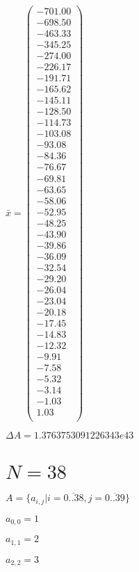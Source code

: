 \documentclass[a4paper,12pt]{article}
\begin{document}
$\bar { x } = \begin{pmatrix}
-701.00 \\
-698.50 \\
-463.33 \\
-345.25 \\
-274.00 \\
-226.17 \\
-191.71 \\
-165.62 \\
-145.11 \\
-128.50 \\
-114.73 \\
-103.08 \\
-93.08 \\
-84.36 \\
-76.67 \\
-69.81 \\
-63.65 \\
-58.06 \\
-52.95 \\
-48.25 \\
-43.90 \\
-39.86 \\
-36.09 \\
-32.54 \\
-29.20 \\
-26.04 \\
-23.04 \\
-20.18 \\
-17.45 \\
-14.83 \\
-12.32 \\
-9.91 \\
-7.58 \\
-5.32 \\
-3.14 \\
-1.03 \\
1.03 \\
\end{pmatrix}
$

$\Delta A = 1.3763753091226343e43$



\section{ $N = 38$ }
$A = \{ a _{ i, j } | i = \overline { 0..38 }, j = \overline { 0..39 } \}$

$a _{ 0, 0 } = 1$

$a _{ 1, 1 } = 2$

$a _{ 2, 2 } = 3$
\end{document}
